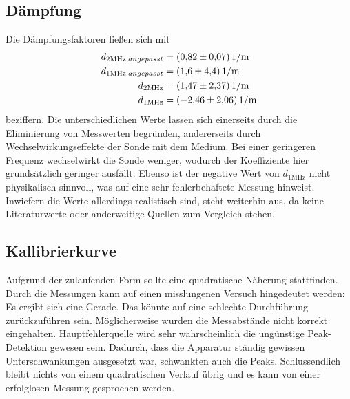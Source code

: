 \subsection{Dämpfung}
Die Dämpfungsfaktoren ließen sich mit 
\begin{align*}
    d_{2 \unit{\mega\hertz},angepasst} &= \qty{0.82(0.07)}{1 \per\meter} \\
    d_{1 \unit{\mega\hertz},angepasst} &= \qty{1.6(4.4)}{1 \per\meter} \\
    d_{2 \unit{\mega\hertz}} &= \qty{1.47 \pm 2.37}{1 \per\meter} \\
    d_{1 \unit{\mega\hertz}} &= \qty{-2.46 \pm 2.06}{1 \per\meter}
\end{align*}
beziffern. Die unterschiedlichen Werte lassen sich einerseits durch die Eliminierung 
von Messwerten begründen, andererseits durch Wechselwirkungseffekte der Sonde 
mit dem Medium. Bei einer geringeren Frequenz wechselwirkt die Sonde weniger, 
wodurch der Koeffiziente hier grundsätzlich geringer ausfällt. Ebenso ist der 
negative Wert von $d_{1 \unit{\mega\hertz}}$ nicht physikalisch sinnvoll, was 
auf eine sehr fehlerbehaftete Messung hinweist. Inwiefern die Werte allerdings 
realistisch sind, steht weiterhin aus, da keine Literaturwerte oder anderweitige 
Quellen zum Vergleich stehen.

\subsection{Kallibrierkurve}
Aufgrund der zulaufenden Form sollte eine quadratische Näherung stattfinden. 
Durch die Messungen kann auf einen misslungenen Versuch hingedeutet werden: 
Es ergibt sich eine Gerade. Das könnte auf eine schlechte Durchführung 
zurückzuführen sein. Möglicherweise wurden die Messabstände nicht korrekt eingehalten.
Hauptfehlerquelle wird sehr wahrscheinlich die ungünstige Peak-Detektion gewesen 
sein. Dadurch, dass die Apparatur ständig gewissen Unterschwankungen ausgesetzt 
war, schwankten auch die Peaks. Schlussendlich bleibt nichts von einem 
quadratischen Verlauf übrig und es kann von einer erfolglosen Messung gesprochen 
werden.